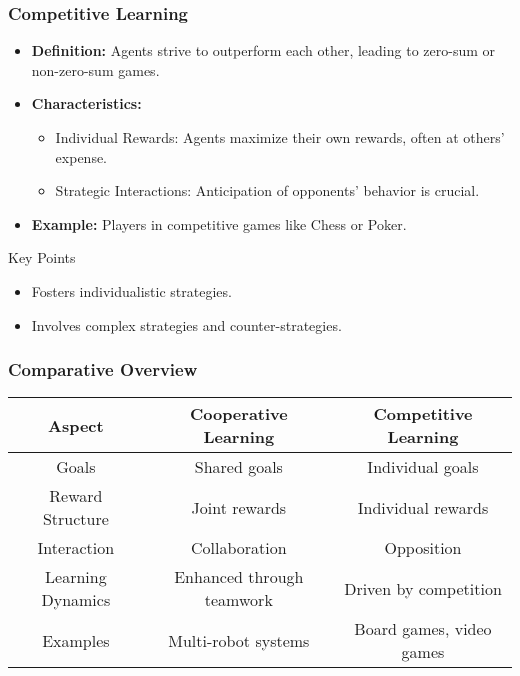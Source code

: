 \documentclass[aspectratio=169]{beamer}
\begin{document}
\begin{frame}[fragile]
    \frametitle{Competitive Learning}
    \begin{itemize}
        \item \textbf{Definition:} Agents strive to outperform each other, leading to zero-sum or non-zero-sum games.
        \item \textbf{Characteristics:}
        \begin{itemize}
            \item Individual Rewards: Agents maximize their own rewards, often at others' expense.
            \item Strategic Interactions: Anticipation of opponents' behavior is crucial.
        \end{itemize}
        \item \textbf{Example:} Players in competitive games like Chess or Poker.
    \end{itemize}
    \begin{block}{Key Points}
        \begin{itemize}
            \item Fosters individualistic strategies.
            \item Involves complex strategies and counter-strategies.
        \end{itemize}
    \end{block}
\end{frame}

\begin{frame}[fragile]
    \frametitle{Comparative Overview}
    \begin{center}
        \begin{tabular}{|c|c|c|}
            \hline
            \textbf{Aspect} & \textbf{Cooperative Learning} & \textbf{Competitive Learning} \\
            \hline
            Goals & Shared goals & Individual goals \\
            \hline
            Reward Structure & Joint rewards & Individual rewards \\
            \hline
            Interaction & Collaboration & Opposition \\
            \hline
            Learning Dynamics & Enhanced through teamwork & Driven by competition \\
            \hline
            Examples & Multi-robot systems & Board games, video games \\
            \hline
        \end{tabular}
    \end{center}
\end{frame}
\end{document}
